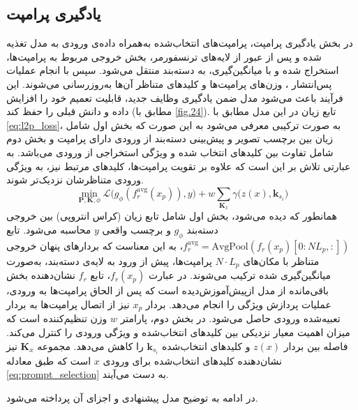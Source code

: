 \subsection{یادگیری پرامپت}
در بخش یادگیری پرامپت، پرامپت‌های انتخاب‌شده به‌همراه داده‌ی ورودی به مدل تغذیه شده و پس از عبور از لایه‌های ترنسفورمر، بخش خروجی مربوط به پرامپت‌ها، استخراج شده و با میانگین‌گیری، به دسته‌بند  منتقل می‌شود. سپس با انجام عملیات پس‌انتشار ، وزن‌های پرامپت‌ها و کلیدهای متناظر آن‌ها به‌روزرسانی می‌شوند. این فرآیند باعث می‌شود مدل ضمن یادگیری وظایف جدید، قابلیت تعمیم خود را افزایش داده و دانش قبلی را حفظ کند (مطابق با \cref{fig.24}). تابع زیان در این مدل مطابق با \eqref{eq:l2p_loss}، به صورت ترکیبی معرفی می‌شود به این صورت که بخش اول شامل زیان بین برچسب تصویر و پیش‌بینی دسته‌بند از ورودی دارای پرامپت و بخش دوم شامل تفاوت بین کلیدهای انتخاب شده و ویژگی استخراجی از ورودی می‌باشد. به عبارتی تلاش بر این است که علاوه بر تقویت پرامپت‌ها، کلیدهای مرتبط نیز، به ویژگی ورودی متناظرشان نزدیک‌‌‌تر شوند. 
\begin{equation}\label{eq:l2p_loss}
	\min_{\mathbf{P}, \mathbf{K}, \phi} 
	\mathcal{L}\big( g_{\phi}( f_r^{\mathrm{avg}} (x_p) ), y \big) 
	+ w \sum_{\mathbf{K}_x} \gamma \big( z(x), \mathbf{k}_{s_i} \big)
\end{equation}
همانطور که دیده می‌شود، بخش اول شامل تابع زیان (کراس انتروپی) بین خروجی دسته‌بند \(g_{\phi}\) و برچسب واقعی \(y\) محاسبه می‌شود. تابع \( f_r^{\mathrm{avg}} = \mathrm{AvgPool}(f_r(x_p)[0 : N L_p, :]) \)، به این معناست که بردارهای پنهان خروجی متناظر با مکان‌های \( N \cdot L_p \) پرامپت‌ها، پیش از ورود به لایه‌ی دسته‌بند، به‌صورت میانگین‌گیری شده ترکیب می‌شوند. 
در عبارت \( f_r(x_p) \)، تابع \( f_r \) نشان‌دهنده بخش باقی‌مانده از مدل ازپیش‌آموزش‌دیده است که پس از الحاق پرامپت‌ها به ورودی، عملیات پردازش ویژگی را انجام می‌دهد. 
بردار \( x_p \) نیز از اتصال پرامپت‌ها به بردار تعبیه‌شده ورودی حاصل می‌شود. در بخش دوم، پارامتر $w$ وزن تنظیم‌کننده است که میزان اهمیت معیار نزدیکی بین کلیدهای انتخاب‌شده و ویژگی ورودی را کنترل می‌کند. فاصله بین بردار \(z(x)\) و کلیدهای انتخاب‌شده \(\mathbf{k}_{s_i}\) را کاهش می‌دهد. مجموعه \(\mathbf{K}_x\) نیز نشان‌دهنده کلیدهای انتخاب‌شده برای ورودی \(x\) است که طبق معادله \eqref{eq:prompt_selection} به دست می‌آیند.

در ادامه به توضیح مدل پیشنهادی و اجزای آن پرداخته می‌شود. 
